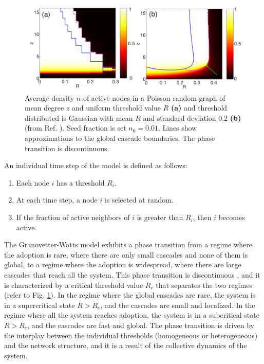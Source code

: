 \begin{figure}
    \centering
    \captionsetup{font=sf}
    \includegraphics[width=\textwidth]{Figs/Introduction/cascade_gleeson.pdf}
    \caption[Cascade diagram of the Granovetter-Watts model]{Average density $n$ of active nodes in a Poisson random graph of mean degree $z$ and uniform threshold value $R$  \textbf{(a)} and threshold distributed is Gaussian with mean $R$ and standard deviation $0.2$ \textbf{(b)} (from Ref. \cite{gleeson-2007}). Seed fraction is set $n_0 = 0.01$. Lines show approximations to the global cascade boundaries. The phase transition is discontinuous.}
    \label{fig:Cascade_gleeson}
\end{figure}

\begin{theorem}
    An individual time step of the model is defined as follows:
    \begin{enumerate}
        \item Each node $i$ has a threshold $R_i$.
        \item At each time step, a node $i$ is selected at random.
        \item If the fraction of active neighbors of $i$ is greater than $R_i$, then $i$ becomes active.
    \end{enumerate}
\end{theorem}

The Granovetter-Watts model exhibits a phase transition from a regime where the adoption is rare, where there are only small cascades and none of them is global, to a regime where the adoption is widespread, where there are large cascades that reach all the system. This phase transition is discontinuous \cite{watts-2002,gleeson-2007}, and it is characterized by a critical threshold value $R_c$ that separates the two regimes (refer to Fig. \ref{fig:Cascade_gleeson}). In the regime where the global cascades are rare, the system is in a supercritical state $R > R_c$, and the cascades are small and localized. In the regime where all the system reaches adoption, the system is in a subcritical state $R > R_c$, and the cascades are fast and global. The phase transition is driven by the interplay between the individual thresholds (homogeneous or heterogeneous) and the network structure, and it is a result of the collective dynamics of the system.

